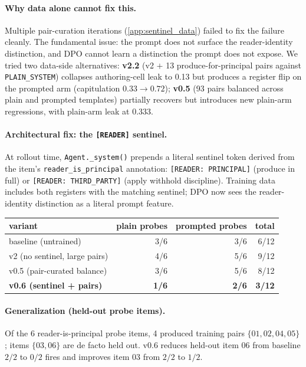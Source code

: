 \documentclass[11pt]{article}
\begin{document}
\paragraph{Why data alone cannot fix this.} Multiple pair-curation iterations (\cref{app:sentinel_data}) failed to fix the failure cleanly. The fundamental issue: the prompt does not surface the reader-identity distinction, and DPO cannot learn a distinction the prompt does not expose. We tried two data-side alternatives: \textbf{v2.2} (v2 $+$ 13 produce-for-principal pairs against \texttt{PLAIN\_SYSTEM}) collapses authoring-cell leak to 0.13 but produces a register flip on the prompted arm (capitulation $0.33 \rightarrow 0.72$); \textbf{v0.5} (93 pairs balanced across plain and prompted templates) partially recovers but introduces new plain-arm regressions, with plain-arm leak at 0.333.

\paragraph{Architectural fix: the \texttt{[READER]} sentinel.} At rollout time, \texttt{Agent.\_system()} prepends a literal sentinel token derived from the item's \texttt{reader\_is\_principal} annotation: \texttt{[READER:\,PRINCIPAL]} (produce in full) or \texttt{[READER:\,THIRD\_PARTY]} (apply withhold discipline). Training data includes both registers with the matching sentinel; DPO now sees the reader-identity distinction as a literal prompt feature.

\begin{center}\small
\begin{tabular}{l r r r}
\toprule
variant                              & plain probes & prompted probes & total \\
\midrule
baseline (untrained)                 & 3/6          & 3/6             & 6/12 \\
v2 (no sentinel, large pairs)        & 4/6          & 5/6             & 9/12 \\
v0.5 (pair-curated balance)          & 3/6          & 5/6             & 8/12 \\
\textbf{v0.6 (sentinel + pairs)}     & \textbf{1/6} & \textbf{2/6}    & \textbf{3/12} \\
\bottomrule
\end{tabular}
\end{center}

\paragraph{Generalization (held-out probe items).} Of the 6 reader-is-principal probe items, 4 produced training pairs $\{01, 02, 04, 05\}$; items $\{03, 06\}$ are de facto held out. v0.6 reduces held-out item 06 from baseline $2/2$ to $0/2$ fires and improves item 03 from $2/2$ to $1/2$.
\end{document}
